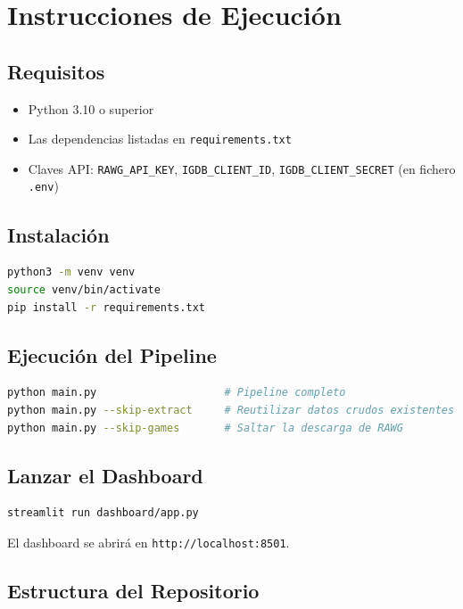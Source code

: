 \documentclass[11pt,a4paper]{article}
\begin{document}
\section{Instrucciones de Ejecución}

\subsection{Requisitos}

\begin{itemize}
  \item Python 3.10 o superior
  \item Las dependencias listadas en \texttt{requirements.txt}
  \item Claves API: \texttt{RAWG\_API\_KEY}, \texttt{IGDB\_CLIENT\_ID}, \texttt{IGDB\_CLIENT\_SECRET} (en fichero \texttt{.env})
\end{itemize}

\subsection{Instalación}

\begin{lstlisting}[language=bash]
python3 -m venv venv
source venv/bin/activate
pip install -r requirements.txt
\end{lstlisting}

\subsection{Ejecución del Pipeline}

\begin{lstlisting}[language=bash]
python main.py                    # Pipeline completo
python main.py --skip-extract     # Reutilizar datos crudos existentes
python main.py --skip-games       # Saltar la descarga de RAWG
\end{lstlisting}

\subsection{Lanzar el Dashboard}

\begin{lstlisting}[language=bash]
streamlit run dashboard/app.py
\end{lstlisting}

El dashboard se abrirá en \texttt{http://localhost:8501}.

\subsection{Estructura del Repositorio}
\end{document}
